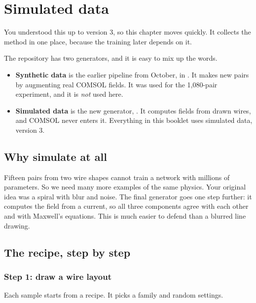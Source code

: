 \chapter{Simulated data}\label{ch:simulation}

You understood this up to version 3, so this chapter moves quickly. It collects the method in
one place, because the training later depends on it.

\begin{careful}
The repository has two generators, and it is easy to mix up the words.
\begin{itemize}
\item \textbf{Synthetic data} is the earlier pipeline from October, in . It makes new pairs by
augmenting real COMSOL fields. It was used for the 1,080-pair experiment, and it is \emph{not} used here.
\item \textbf{Simulated data} is the new generator, . It computes fields from drawn
wires, and COMSOL never enters it. Everything in this booklet uses simulated data, version 3.
\end{itemize}
\end{careful}

\section{Why simulate at all}

Fifteen pairs from two wire shapes cannot train a network with millions of parameters. So we
need many more examples of the same physics. Your original idea was a spiral with blur and noise.
The final generator goes one step further: it computes the field from a current, so all three
components agree with each other and with Maxwell's equations. This is much easier to defend than
a blurred line drawing.

\section{The recipe, step by step}

\subsection*{Step 1: draw a wire layout}

Each sample starts from a recipe. It picks a family and random settings.

